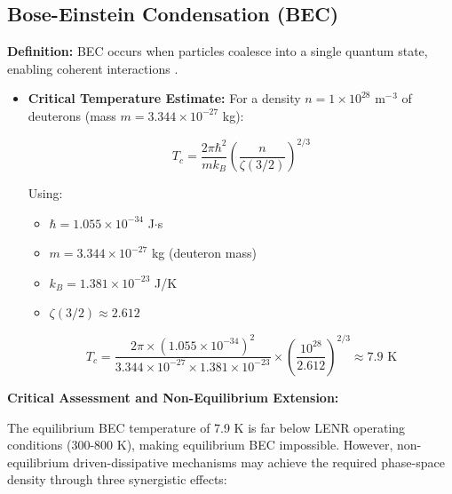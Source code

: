\documentclass[11pt,a4paper]{article}
\begin{document}
\subsection{Bose-Einstein Condensation (BEC)}

\textbf{Definition:} BEC occurs when particles coalesce into a single quantum state, enabling coherent interactions \citep{kim2001}.

\begin{itemize}
\item
  \textbf{Critical Temperature Estimate:} For a density $n = 1 \times 10^{28}$ m$^{-}$$^{3}$ of deuterons (mass $m = 3.344 \times 10^{-27}$ kg):

  \begin{equation}
T_c = \frac{2\pi \hbar^2}{m k_B} \left(\frac{n}{\zeta(3/2)}\right)^{2/3}
\end{equation}

  Using:

  \begin{itemize}
    \item
    $\hbar = 1.055 \times 10^{-34}$ J$\cdot$s
  \item
    $m = 3.344 \times 10^{-27}$ kg (deuteron mass)
  \item
    $k_B = 1.381 \times 10^{-23}$ J/K
  \item
    $\zeta(3/2) \approx 2.612$
  \end{itemize}

  \begin{equation}
T_c = \frac{2\pi \times (1.055 \times 10^{-34})^2}{3.344 \times 10^{-27} \times 1.381 \times 10^{-23}} \times \left(\frac{10^{28}}{2.612}\right)^{2/3} \approx 7.9 \text{ K}
\end{equation}
\end{itemize}

\textbf{Critical Assessment and Non-Equilibrium Extension:}

The equilibrium BEC temperature of 7.9 K is far below LENR operating conditions (300-800 K), making equilibrium BEC impossible. However, non-equilibrium driven-dissipative mechanisms may achieve the required phase-space density through three synergistic effects:
\end{document}
